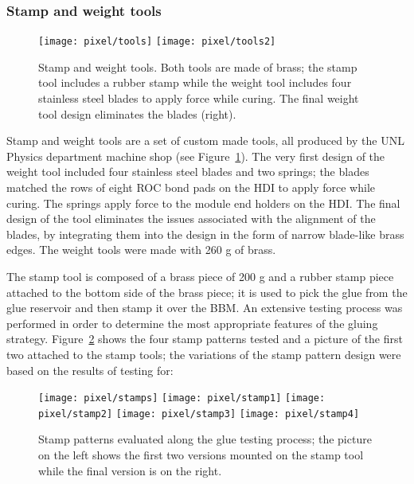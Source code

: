 \subsubsection*{Stamp and weight tools}

\begin{figure}[!h]
  \centering
  \texttt{[image: pixel/tools]}
  \texttt{[image: pixel/tools2]}
  \caption[Stamp and Weight tools]{Stamp and weight tools. Both tools are made of brass; the stamp tool includes a rubber stamp while the weight tool includes four stainless steel blades to apply force while curing. The final weight tool design eliminates the blades (right).}\label{fig:st_wt}
\end{figure}

Stamp and weight tools are a set of custom made tools, all produced by the UNL Physics department machine shop (see Figure~\ref{fig:st_wt}). The very first design of the weight tool included four stainless steel blades and two springs; the blades matched the rows of eight ROC bond pads on the HDI to apply force while curing. The springs apply force to the module end holders on the HDI. The final design of the tool eliminates the issues associated with the alignment of the blades, by integrating them into the design in the form of narrow blade-like brass edges. The weight tools were made with 260 g of brass.      

The stamp tool is composed of a brass piece of 200 g and a rubber stamp piece attached to the bottom side of the brass piece; it is used to pick the glue from the glue reservoir and then stamp it over the BBM. An extensive testing process was performed in order to determine the most appropriate features of the gluing strategy. Figure~\ref{fig:stamp_pattern} shows the four stamp patterns tested and a picture of the first two attached to the stamp tools; the variations of the stamp pattern design were based on the results of testing for:

\begin{figure}[!h]
  \centering  
  \texttt{[image: pixel/stamps]}
  \texttt{[image: pixel/stamp1]}
  \texttt{[image: pixel/stamp2]}
  \texttt{[image: pixel/stamp3]}
  \texttt{[image: pixel/stamp4]}
  \caption[Stamp patterns]{Stamp patterns evaluated along the glue testing process; the picture on the left shows the first two versions mounted on the stamp tool while the final version is on the right.}\label{fig:stamp_pattern}
\end{figure}

